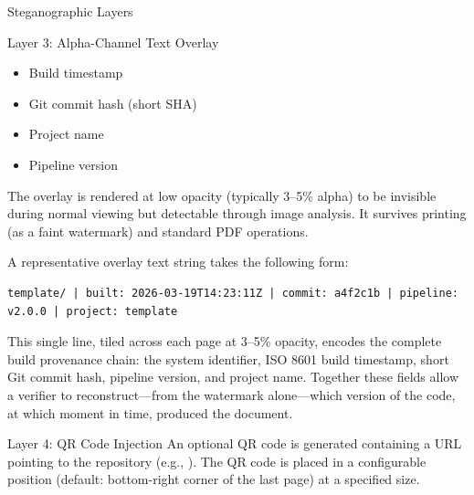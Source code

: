\documentclass[
  ignorenonframetext,
]{beamer}
\providecommand{\tightlist}{%
  \setlength{\itemsep}{0pt}\setlength{\parskip}{0pt}}
\begin{document}
\begin{frame}{Steganographic Layers}
\begin{block}{Layer 3: Alpha-Channel Text Overlay}
\begin{itemize}
\tightlist
\item
  Build timestamp
\item
  Git commit hash (short SHA)
\item
  Project name
\item
  Pipeline version
\end{itemize}

The overlay is rendered at low opacity (typically 3--5\% alpha) to be
invisible during normal viewing but detectable through image analysis.
It survives printing (as a faint watermark) and standard PDF operations.

A representative overlay text string takes the following form:

\begin{verbatim}
template/ | built: 2026-03-19T14:23:11Z | commit: a4f2c1b | pipeline: v2.0.0 | project: template
\end{verbatim}

This single line, tiled across each page at 3--5\% opacity, encodes the
complete build provenance chain: the system identifier, ISO 8601 build
timestamp, short Git commit hash, pipeline version, and project name.
Together these fields allow a verifier to reconstruct---from the
watermark alone---which version of the code, at which moment in time,
produced the document.
\end{block}

\begin{block}{Layer 4: QR Code Injection}
\protect{}\label{layer-4-qr-code-injection}
An optional QR code is generated containing a URL pointing to the
repository (e.g., ). The QR code
is placed in a configurable position (default: bottom-right corner of
the last page) at a specified size.
\end{block}
\end{frame}
\end{document}

